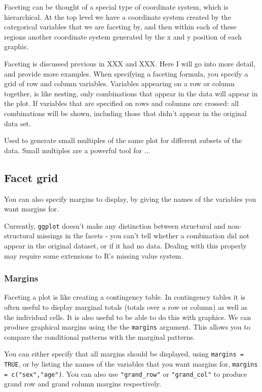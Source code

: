 Faceting can be thought of a special type of coordinate system, which is hierarchical.  At the top level we have a coordinate system created by the categorical variables that we are faceting by, and then within each of these regions another coordinate system generated by the x and y position of each graphic.

Faceting is discussed previous in XXX and XXX.  Here I will go into more detail, and provide more examples.  When specifying a faceting formula, you specify a grid of row and column variables.  Variables appearing on a row or column together, is like nesting, only combinations that appear in the data will appear in the plot.  If variables that are specified on rows and columns are crossed: all combinations will be shown, including those that didn't appear in the original data set.

Used to generate small multiples of the same plot for different subsets of the data.  Small multiples are a powerful tool for ...  

\subsection{Facet grid}

You can also specify margins to display, by giving the names of the variables you want margins for.  


Currently, {\tt ggplot} doesn't make any distinction between structural and non-structural missings in the facets - you can't tell whether a combination did not appear in the original dataset, or if it had no data.  Dealing with this properly may require some extensions to R's missing value system.  


\subsubsection{Margins}\label{sub:margins}

Faceting a plot is like creating a contingency table.  In contingency tables it is often useful to display marginal totals (totals over a row or column) as well as the individual cells.  It is also useful to be able to do this with graphics.  We can produce graphical margins using the the {\tt margins} argument.  This allows you to compare the conditional patterns with the marginal patterns.

You can either specify that all margins should be displayed, using {\tt margins = TRUE}, or by listing the names of the variables that you want margins for, {\tt margins = c("sex","age")}.  You can also use \verb|"grand_row"| or \verb|"grand_col"| to produce grand row and grand column margins respectively.

